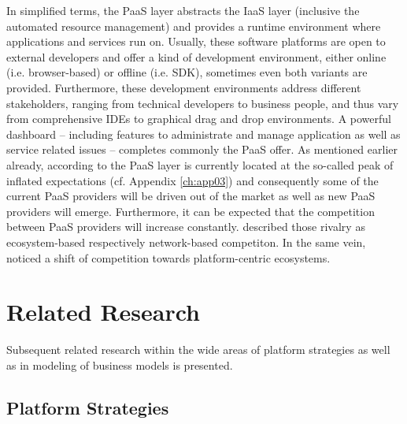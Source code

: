 In simplified terms, the \ac{PaaS} layer abstracts the \ac{IaaS} layer (inclusive the automated resource management) and provides a runtime environment where applications and services run on. Usually, these software platforms are open to external developers and offer a kind of development environment, either online (i.e. browser-based) or offline (i.e. \ac{SDK}), sometimes even both variants are provided. Furthermore, these development environments address different stakeholders, ranging from technical developers to business people, and thus vary from comprehensive \acp{IDE} to graphical drag and drop environments. A powerful dashboard -- including features to administrate and manage application as well as service related issues -- completes commonly the \ac{PaaS} offer.
As mentioned earlier already, according to \citet[p. 5]{Smith2012} the \ac{PaaS} layer is currently located at the so-called peak of inflated expectations (cf. Appendix \ref{ch:app03}) and consequently some of the current \ac{PaaS} providers will be driven out of the market as well as new \ac{PaaS} providers will emerge. Furthermore, it can be expected that the competition between \ac{PaaS} providers will increase constantly. \citet[pp. 117,128-129]{Iyer2010} described those rivalry as ecosystem-based respectively network-based competiton. In the same vein, \citet[pp. 675-676]{Tiwana2010} noticed a shift of competition towards platform-centric ecosystems.

\section{Related Research}\label{ch:tf:rw}

Subsequent related research within the wide areas of platform strategies as well as in modeling of business models is presented.

\subsection{Platform Strategies}\label{ch:tf:rw:ps}

